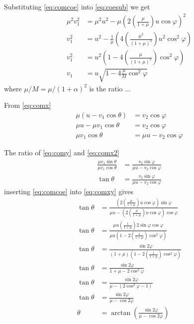 \documentclass[twoside,english]{uiofysmaster/uiofysmaster}
\let\orgautoref\autoref
\renewcommand{\autoref}
        {\def\equationautorefname{Eq.}%
         \def\figureautorefname{Fig.}%
         \def\subfigureautorefname{Fig.}%
         \def\sectionautorefname{Sec.}%
         \def\subsectionautorefname{Sec.}%
         \def\subsubsectionautorefname{Sec.}%
         \def\Itemautorefname{item}%
         \def\tableautorefname{Tab.}%
         \orgautoref}
\begin{document}
\begin{appendices}
Substituting \autoref{eq:comcoe} into \autoref{eq:coesub} we get
\begin{align}\label{eq:coesubsub}
    \mu^2 v_1^2 &= \mu^2 u^2 - \mu \left( 2 \left( \frac{\mu}{1 + \mu} \right) u \cos \varphi  \right)^2  \nonumber\\
    v_1^2 &= u^2 - \frac{1}{\mu} \left( 4 \left( \frac{\mu^2}{(1 + \mu)^2} \right) u^2 \cos^2 \varphi  \right)  \nonumber\\
    v_1^2 &= u^2 \left(1 - 4 \left( \frac{\mu}{(1 + \mu)^2} \right) \cos^2 \varphi  \right)  \nonumber\\
    v_1 &= u \sqrt{1 - 4 \frac{\mu}{M} \cos^2 \varphi}
\end{align}
where $\mu/M = \mu/(1 + \alpha)^2$ is the ratio ...

From \autoref{eq:comx} 
\begin{align}\label{eq:comx2}
	\mu (u - v_1 \cos \theta) &= v_2 \cos \varphi  \nonumber\\
	\mu u - \mu v_1 \cos \theta &= v_2 \cos \varphi  \nonumber\\
	\mu v_1 \cos \theta &= \mu u - v_2 \cos \varphi
\end{align}

The ratio of \autoref{eq:comy} and \autoref{eq:comx2}
\begin{align}\label{eq:comxy}
	\frac{\mu v_1 \sin \theta}{\mu v_1 \cos \theta} &= \frac{v_2 \sin \varphi}{\mu u - v_2 \cos \varphi}  \nonumber\\
	\tan \theta &= \frac{v_2 \sin \varphi}{\mu u - v_2 \cos \varphi}
\end{align}
inserting \autoref{eq:comcoe} into \autoref{eq:comxy} gives
\begin{align}\label{eq:tanB}
	\tan \theta &= \frac{\left( 2 \left( \frac{\mu}{1 + \mu} \right) u \cos \varphi  \right) \sin \varphi}{\mu u - \left( 2 \left( \frac{\mu}{1 + \mu} \right) u \cos \varphi  \right) \cos \varphi}  \nonumber\\
	\tan \theta &= \frac{\mu u \left( \frac{1}{1 + \mu} \right) 2 \sin \varphi \cos \varphi}{\mu u \left(1 - 2 \left( \frac{1}{1 + \mu} \right) \cos^2 \varphi \right)}  \nonumber\\
	\tan \theta &= \frac{\sin 2\varphi}{(1 + \mu)\left(1 - 2 \left( \frac{1}{1 + \mu} \right) \cos^2 \varphi \right)}  \nonumber\\
	\tan \theta &= \frac{\sin 2\varphi}{1 + \mu - 2 \cos^2 \varphi}  \nonumber\\
	\tan \theta &= \frac{\sin 2\varphi}{\mu - (2 \cos^2 \varphi - 1)}  \nonumber\\
	\tan \theta &= \frac{\sin 2\varphi}{\mu - \cos 2\varphi}  \nonumber\\
	\theta &= \arctan \left( \frac{\sin 2\varphi}{\mu - \cos 2\varphi} \right)
\end{align}




\end{appendices}
\end{document}
